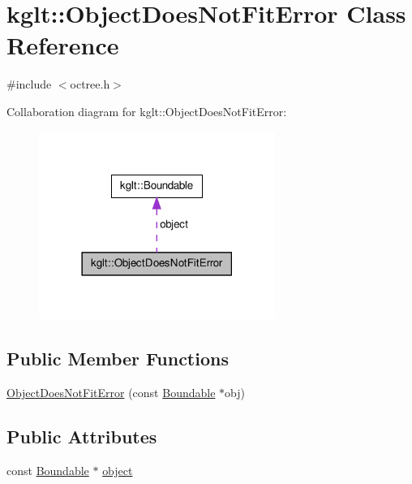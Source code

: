 \hypertarget{classkglt_1_1_object_does_not_fit_error}{\section{kglt\-:\-:Object\-Does\-Not\-Fit\-Error Class Reference}
\label{classkglt_1_1_object_does_not_fit_error}
}


{\ttfamily \#include $<$octree.\-h$>$}



Collaboration diagram for kglt\-:\-:Object\-Does\-Not\-Fit\-Error\-:\nopagebreak
\begin{figure}[H]
\begin{center}
\leavevmode
\includegraphics[width=218pt]{classkglt_1_1_object_does_not_fit_error__coll__graph}
\end{center}
\end{figure}
\subsection*{Public Member Functions}
\begin{DoxyCompactItemize}
\item 
\hyperlink{classkglt_1_1_object_does_not_fit_error_a2439ba99b0f408ea63c005bebce225d0}{Object\-Does\-Not\-Fit\-Error} (const \hyperlink{classkglt_1_1_boundable}{Boundable} $\ast$obj)
\end{DoxyCompactItemize}
\subsection*{Public Attributes}
\begin{DoxyCompactItemize}
\item 
const \hyperlink{classkglt_1_1_boundable}{Boundable} $\ast$ \hyperlink{classkglt_1_1_object_does_not_fit_error_a1e34532e61f58fe3275028ef18e6c42d}{object}
\end{DoxyCompactItemize}


